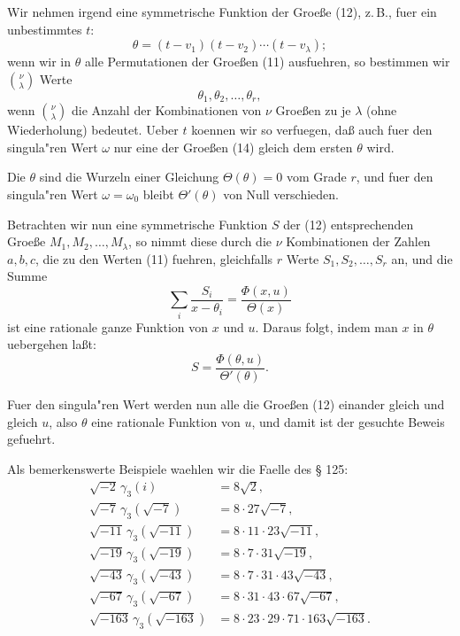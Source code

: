 \documentclass[12pt,a4paper]{article}
\theoremstyle{plain}
\theoremstyle{definition}
\theoremstyle{remark}
\begin{document}
Wir nehmen irgend eine symmetrische Funktion der Groe\ss{}e (12), z.\,B., fuer ein unbestimmtes $t$:
\begin{equation}\label{eq:134_13}
\theta = (t - v_1)(t - v_2) \cdots (t - v_\lambda);
\end{equation}
wenn wir in $\theta$ alle Permutationen der Groe\ss{}en (11) ausfuehren, so bestimmen wir $\binom{\nu}{\lambda}$ Werte
\begin{equation}\label{eq:134_14}
\theta_1, \theta_2, \ldots, \theta_r,
\end{equation}
wenn $\binom{\nu}{\lambda}$ die Anzahl der Kombinationen von $\nu$ Groe\ss{}en zu je $\lambda$ (ohne Wiederholung) bedeutet. Ueber $t$ koennen wir so verfuegen, da\ss{} auch fuer den singula"ren Wert $\omega$ nur eine der Groe\ss{}en (14) gleich dem ersten $\theta$ wird.

Die $\theta$ sind die Wurzeln einer Gleichung $\Theta(\theta) = 0$ vom Grade $r$, und fuer den singula"ren Wert $\omega = \omega_0$ bleibt $\Theta'(\theta)$ von Null verschieden.

Betrachten wir nun eine symmetrische Funktion $S$ der (12) entsprechenden Groe\ss{}e $M_1, M_2, \ldots, M_\lambda$, so nimmt diese durch die $\nu$ Kombinationen der Zahlen $a, b, c$, die zu den Werten (11) fuehren, gleichfalls $r$ Werte $S_1, S_2, \ldots, S_r$ an, und die Summe
\[
\sum_{i} \frac{S_i}{x - \theta_i} = \frac{\Phi(x, u)}{\Theta(x)}
\]
ist eine rationale ganze Funktion von $x$ und $u$. Daraus folgt, indem man $x$ in $\theta$ uebergehen la\ss{}t:
\[
S = \frac{\Phi(\theta, u)}{\Theta'(\theta)}.
\]

Fuer den singula"ren Wert werden nun alle die Groe\ss{}en (12) einander gleich und gleich $u$, also $\theta$ eine rationale Funktion von $u$, und damit ist der gesuchte Beweis gefuehrt.

Als bemerkenswerte Beispiele waehlen wir die Faelle des \S{} 125:
\begin{align*}
\sqrt{-2}\, \gamma_3(i) &= 8\sqrt{2}, \\
\sqrt{-7}\, \gamma_3(\sqrt{-7}) &= 8 \cdot 27\sqrt{-7}, \\
\sqrt{-11}\, \gamma_3(\sqrt{-11}) &= 8 \cdot 11 \cdot 23\sqrt{-11}, \\
\sqrt{-19}\, \gamma_3(\sqrt{-19}) &= 8 \cdot 7 \cdot 31\sqrt{-19}, \\
\sqrt{-43}\, \gamma_3(\sqrt{-43}) &= 8 \cdot 7 \cdot 31 \cdot 43\sqrt{-43}, \\
\sqrt{-67}\, \gamma_3(\sqrt{-67}) &= 8 \cdot 31 \cdot 43 \cdot 67\sqrt{-67}, \\
\sqrt{-163}\, \gamma_3(\sqrt{-163}) &= 8 \cdot 23 \cdot 29 \cdot 71 \cdot 163\sqrt{-163}.
\end{align*}
\end{document}
